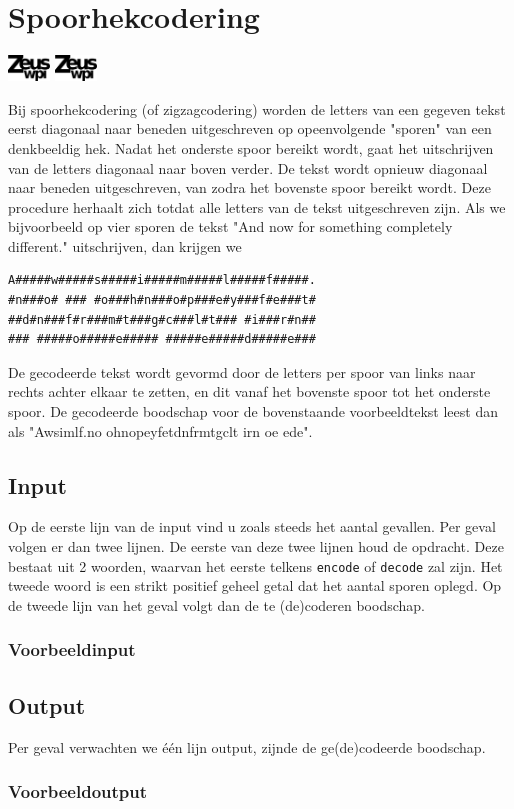 \documentclass[a4paper]{article}
\begin{document}
\section*{Spoorhekcodering}
\flushright
\includegraphics[width=3em]{../logo-new.png}
\includegraphics[width=3em]{../logo-new.png}
\flushleft

Bij spoorhekcodering (of zigzagcodering) worden de letters van een gegeven tekst
eerst diagonaal naar beneden uitgeschreven op opeenvolgende "sporen" van een
denkbeeldig hek. Nadat het onderste spoor bereikt wordt, gaat het uitschrijven
van de letters diagonaal naar boven verder. De tekst wordt opnieuw diagonaal
naar beneden uitgeschreven, van zodra het bovenste spoor bereikt wordt. Deze
procedure herhaalt zich totdat alle letters van de tekst uitgeschreven zijn. Als
we bijvoorbeeld op vier sporen de tekst "And now for something completely
different." uitschrijven, dan krijgen we

\begin{verbatim}
A#####w#####s#####i#####m#####l#####f#####.
#n###o# ### #o###h#n###o#p###e#y###f#e###t#
##d#n###f#r###m#t###g#c###l#t### #i###r#n##
### #####o#####e##### #####e#####d#####e###
\end{verbatim}

De gecodeerde tekst wordt gevormd door de letters per spoor van links naar
rechts achter elkaar te zetten, en dit vanaf het bovenste spoor tot het onderste
spoor. De gecodeerde boodschap voor de bovenstaande voorbeeldtekst leest dan als
"Awsimlf.no  ohnopeyfetdnfrmtgclt irn oe ede".

\subsection*{Input}

Op de eerste lijn van de input vind u zoals steeds het aantal gevallen. Per
geval volgen er dan twee lijnen. De eerste van deze twee lijnen houd de
opdracht. Deze bestaat uit 2 woorden, waarvan het eerste telkens \texttt{encode}
of \texttt{decode} zal zijn. Het tweede woord is een strikt positief geheel
getal dat het aantal sporen oplegd. Op de tweede lijn van het geval volgt dan de
te (de)coderen boodschap.

\subsubsection*{Voorbeeldinput}



\subsection*{Output}

Per geval verwachten we \'e\'en lijn output, zijnde de ge(de)codeerde boodschap.

\subsubsection*{Voorbeeldoutput}


\end{document}
